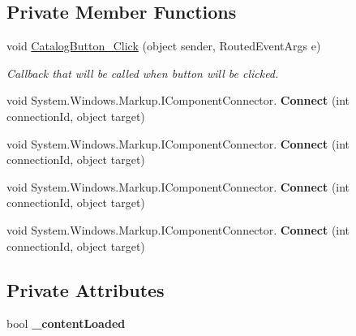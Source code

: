 \subsection*{Private Member Functions}
\begin{DoxyCompactItemize}
\item 
void \mbox{\hyperlink{class_teacher_handbook_1_1_controls_1_1_catalog_button_ab6fdcafe2b97c645486d1ca83109c979}{Catalog\+Button\+\_\+\+Click}} (object sender, Routed\+Event\+Args e)
\begin{DoxyCompactList}\small\item\em Callback that will be called when button will be clicked. \end{DoxyCompactList}\item 
\mbox{\label{class_teacher_handbook_1_1_controls_1_1_catalog_button_aee1606053e8ffdb900fd8cb3f1d71bd4}} 
void System.\+Windows.\+Markup.\+I\+Component\+Connector. {\bfseries Connect} (int connection\+Id, object target)
\item 
\mbox{\label{class_teacher_handbook_1_1_controls_1_1_catalog_button_aee1606053e8ffdb900fd8cb3f1d71bd4}} 
void System.\+Windows.\+Markup.\+I\+Component\+Connector. {\bfseries Connect} (int connection\+Id, object target)
\item 
\mbox{\label{class_teacher_handbook_1_1_controls_1_1_catalog_button_aee1606053e8ffdb900fd8cb3f1d71bd4}} 
void System.\+Windows.\+Markup.\+I\+Component\+Connector. {\bfseries Connect} (int connection\+Id, object target)
\item 
\mbox{\label{class_teacher_handbook_1_1_controls_1_1_catalog_button_aee1606053e8ffdb900fd8cb3f1d71bd4}} 
void System.\+Windows.\+Markup.\+I\+Component\+Connector. {\bfseries Connect} (int connection\+Id, object target)
\end{DoxyCompactItemize}
\subsection*{Private Attributes}
\begin{DoxyCompactItemize}
\item 
\mbox{\label{class_teacher_handbook_1_1_controls_1_1_catalog_button_a4d31da551e1ef4555ef13f04afd6342c}} 
bool {\bfseries \+\_\+content\+Loaded}
\end{DoxyCompactItemize}


